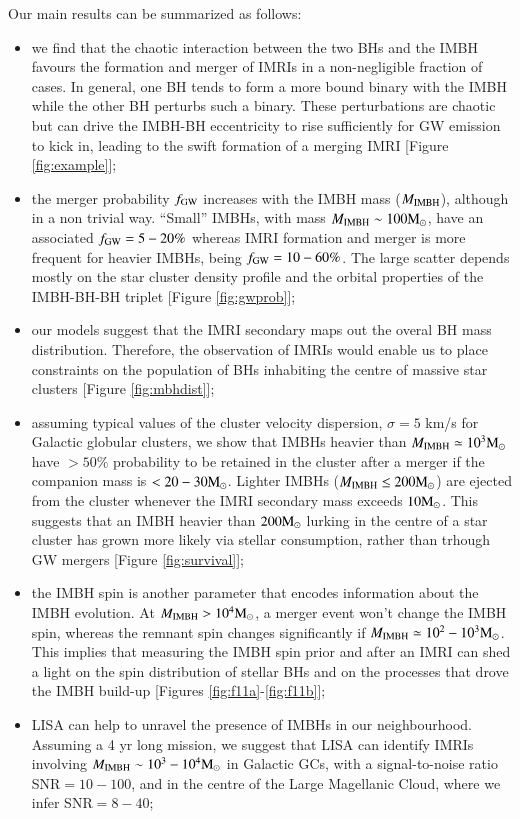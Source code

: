 \documentclass[article]{aa}
\newcommand{\Ms}{{\rm M}_\odot}
\newcommand{\gw}{{\rm GW}}
\newcommand{\ibh}{{\rm IMBH}}
\begin{document}
{Our main results can be summarized as follows:
\begin{itemize}
\item we find that the chaotic interaction between the two BHs and the IMBH favours the formation and merger of IMRIs in a non-negligible fraction of cases. In general, one BH tends to form a more bound binary with the IMBH while the other BH perturbs such a binary. These perturbations are chaotic but can drive the IMBH-BH eccentricity to rise sufficiently for GW emission to kick in, leading to the swift formation
of a merging IMRI [Figure \ref{fig:example}];
\item the merger probability $f_\gw$ increases with the IMBH mass ($M_\ibh$), although in a non trivial way. ``Small'' IMBHs, with mass $M_\ibh \sim 100 \Ms$, have an associated $f_\gw = 5-20\%$ whereas IMRI formation and merger is more frequent for heavier IMBHs, being $f_\gw = 10-60\%$. The large scatter depends mostly on the star cluster density profile and the orbital properties of the IMBH-BH-BH triplet [Figure \ref{fig:gwprob}];
\item our models suggest that the IMRI secondary maps out the overal BH mass distribution. Therefore, the observation of IMRIs would enable us to place constraints on the population of BHs inhabiting the centre of massive star clusters [Figure \ref{fig:mbhdist}];
\item assuming typical values of the cluster velocity dispersion, $\sigma = 5$ km/s for Galactic globular clusters, we show that IMBHs heavier than $M_\ibh \simeq 10^3\Ms$ have $>50\%$ probability to be retained in the cluster after a merger if the companion mass is $<20-30 \Ms$. Lighter IMBHs ($M_\ibh \leq 200\Ms$) are ejected from the cluster whenever the IMRI secondary mass exceeds $10\Ms$. This suggests that an IMBH heavier than $200\Ms$ lurking in the centre of a star cluster has grown more likely via stellar consumption, rather than trhough GW mergers [Figure \ref{fig:survival}];
\item the IMBH spin is another parameter that encodes information about the IMBH evolution. At $M_\ibh>10^4\Ms$, a merger event won't change the IMBH spin, whereas the remnant spin changes significantly if $M_\ibh\simeq10^2-10^3\Ms$. This implies that measuring the IMBH spin prior and after an IMRI can shed a light on the spin distribution of stellar BHs and on the processes that drove the IMBH build-up [Figures \ref{fig:f11a}-\ref{fig:f11b}];
\item LISA can help to unravel the presence of IMBHs in our neighbourhood. Assuming a 4 yr long mission, we suggest that LISA can identify IMRIs involving $M_\ibh \sim 10^3-10^4\Ms$ in Galactic GCs, with a signal-to-noise ratio SNR$=10-100$, and in the centre of the Large Magellanic Cloud, where we infer SNR$=8-40$;

\end{itemize}}
\end{document}

